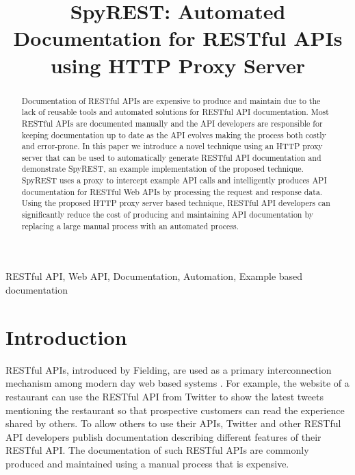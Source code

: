 \documentclass[conference]{IEEEtran}
\begin{document}
\title{SpyREST: Automated Documentation for RESTful APIs using HTTP Proxy Server}


\author{
}
\maketitle


\begin{abstract}
Documentation of RESTful APIs are expensive to produce and maintain due to the lack of reusable tools and automated solutions for RESTful API documentation. Most RESTful APIs are documented manually and the API developers are responsible for keeping documentation up to date as the API evolves making the process both costly and error-prone. In this paper we introduce a novel technique using an HTTP proxy server that can be used to automatically generate RESTful API documentation and demonstrate SpyREST, an example implementation of the proposed technique. SpyREST uses a proxy to intercept example API calls and intelligently produces API documentation for RESTful Web APIs by processing the request and response data. Using the proposed HTTP proxy server based technique, RESTful API developers can significantly reduce the cost of producing and maintaining API documentation by replacing a large manual process with an automated process.
\end{abstract}

\IEEEpeerreviewmaketitle

\begin{IEEEkeywords}
RESTful API, Web API, Documentation, Automation, Example based documentation
\end{IEEEkeywords}


\section{Introduction}
RESTful APIs, introduced by Fielding, are used as a primary interconnection mechanism among modern day web based systems \cite{Fielding_rest}. For example, the website of a restaurant can use the RESTful API from Twitter to show the latest tweets mentioning the restaurant so that prospective customers can read the experience shared by others. To allow others to use their APIs, Twitter and other RESTful API developers publish documentation describing different features of their RESTful API. The documentation of such RESTful APIs are commonly produced and maintained using a manual process that is expensive.
\end{document}
